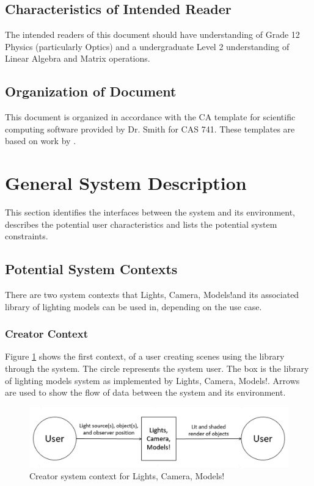 \documentclass[12pt]{article}
\newcommand{\famname}{Lights, Camera, Models!} %
\begin{document}
\subsection{Characteristics of Intended Reader}
The intended readers of this document should have understanding of Grade 12 
Physics (particularly Optics) and a undergraduate Level 2 understanding of 
Linear Algebra and Matrix operations.  

\subsection{Organization of Document}
This document is organized in accordance with the CA template for scientific 
computing software provided by Dr. Smith for CAS 741. These templates are based 
on work by \citet{Smith2006}.

\section{General System Description}
This section identifies the interfaces between the system and its environment,
describes the potential user characteristics and lists the potential system
constraints.

\subsection{Potential System Contexts}
There are two system contexts that \famname and its associated library of 
lighting models can be used in, depending on the use case.

\subsubsection{Creator Context}
Figure \ref{fig:system-context} shows the first context, of a user creating 
scenes using the library through the system. The circle represents the system 
user. The box is the library of lighting models system as implemented by 
\famname. Arrows are used to show the flow of data between the system and its 
environment.

\begin{figure}[h]
	\centering
	\includegraphics[scale=0.5]{./images/system-context}
	\caption{Creator system context for \famname}
	\label{fig:system-context}
\end{figure}
\end{document}
